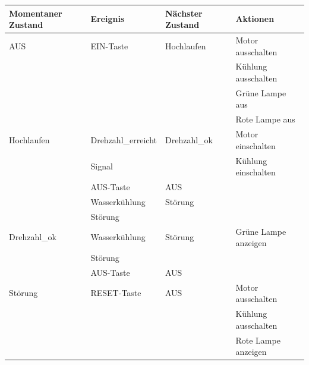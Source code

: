 \renewcommand{\arraystretch}{1}
\begin{tabular}{|l|l|l|l|}
  \hline
  \textbf{Momentaner Zustand} & \textbf{Ereignis}  & \textbf{Nächster
  Zustand}                    & \textbf{Aktionen}                                            \\
  \hline
  AUS                         & EIN-Taste          & Hochlaufen       & Motor ausschalten    \\
                              &                    &                  & Kühlung ausschalten  \\&&&Grüne Lampe aus\\&&&Rote Lampe aus\\
  \hline
  Hochlaufen                  & Drehzahl\_erreicht & Drehzahl\_ok     & Motor einschalten    \\
                              & Signal             &                  & Kühlung einschalten  \\ \cline{2-3}
                              & AUS-Taste          & AUS              &                      \\\cline{2-3}
                              & Wasserkühlung      & Störung          &                      \\
                              & Störung            &                  &                      \\
  \hline
  Drehzahl\_ok                & Wasserkühlung      & Störung          & Grüne Lampe anzeigen \\
                              & Störung            &                  &                      \\ \cline{2-3}
                              & AUS-Taste          & AUS              &                      \\
  \hline
  Störung                     & RESET-Taste        & AUS              & Motor ausschalten    \\
                              &                    &                  & Kühlung ausschalten  \\&&&Rote Lampe anzeigen\\
  \hline
\end{tabular}
\renewcommand{\arraystretch}{1.8}

